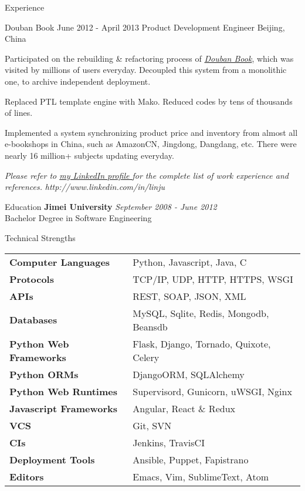 \documentclass{resume}
\begin{document}
\begin{rSection}{Experience}
    \begin{rSubsection}{Douban Book}{ June 2012 - April 2013 }{ Product Development Engineer }{Beijing, China}
    \item Participated on the rebuilding \& refactoring process of \href{book.douban.com}{\textit {Douban Book}}, which was visited by millions of users everyday. Decoupled this system from a monolithic one, to archive independent deployment.
    \item Replaced PTL template engine with Mako.  Reduced codes by tens of thousands of lines.
    \item Implemented a system synchronizing product price and inventory from almost all e-bookshops in China, such as AmazonCN, Jingdong, Dangdang, etc. There were nearly 16 million+ subjects updating everyday.
    \end{rSubsection}

  \end{rSection}

  \begin{center}
  \textit{ Please refer to \href{http://www.linkedin.com/in/linju}{ my LinkedIn profile } for the complete list of work experience and references.}
  \textit{ http://www.linkedin.com/in/linju }
  \end{center}

  \newpage

  \begin{rSection}{Education}
    { \bf Jimei University  } \hfill {\em September 2008 - June 2012 } \\
    { Bachelor Degree in Software Engineering } \\
  \end{rSection}

  \begin{rSection}{Technical Strengths}
    \begin{tabular}{ @{} >{\bfseries}l @{\hspace{6ex}} l }
      Computer Languages & Python, Javascript, Java, C \\
      Protocols & TCP/IP, UDP, HTTP, HTTPS, WSGI \\
      APIs & REST, SOAP, JSON, XML \\
      Databases & MySQL, Sqlite, Redis, Mongodb, Beansdb \\
      Python Web Frameworks & Flask, Django, Tornado, Quixote, Celery \\
      Python ORMs & DjangoORM, SQLAlchemy \\
      Python Web Runtimes & Supervisord, Gunicorn, uWSGI, Nginx \\
      Javascript Frameworks & Angular, React \& Redux \\
      VCS & Git, SVN \\
      CIs & Jenkins, TravisCI \\
      Deployment Tools & Ansible, Puppet, Fapistrano \\
      Editors & Emacs, Vim, SublimeText, Atom \\
    \end{tabular}
  \end{rSection}
\end{document}
